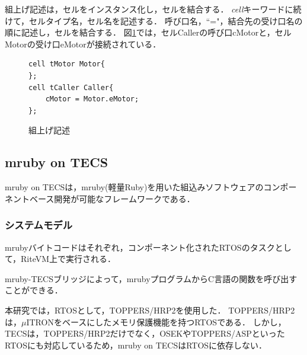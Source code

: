 \documentclass[submit,techrep]{ipsj}
\begin{document}
        組上げ記述は，セルをインスタンス化し，セルを結合する．
        {\it cell}キーワードに続けて，セルタイプ名，セル名を記述する．
        呼び口名，``="，結合先の受け口名の順に記述し，セルを結合する．
        図\ref{build}では，セルCallerの呼び口cMotorと，セルMotorの受け口eMotorが接続されている．
        
\begin{figure}[t]
\centering
\begin{lstlisting}
cell tMotor Motor{
};
cell tCaller Caller{
    cMotor = Motor.eMotor;
};
\end{lstlisting}
\caption{組上げ記述}
\vspace{-2mm}
\label{build}
\end{figure}

\vspace{-3mm} 
\subsection{mruby on TECS}
\label{sec:mruby on TECS}
mruby on TECSは，mruby(軽量Ruby)を用いた組込みソフトウェアのコンポーネントベース開発が可能なフレームワークである．

\subsubsection{システムモデル}
mrubyバイトコードはそれぞれ，コンポーネント化されたRTOSのタスクとして，RiteVM上で実行される．

mruby-TECSブリッジによって，mrubyプログラムからC言語の関数を呼び出すことができる．

本研究では，RTOSとして，TOPPERS/HRP2\cite{par:hr-tecs}を使用した．
TOPPERS/HRP2は，$\mu$ITRON\cite{par:microITRON}をベースにしたメモリ保護機能を持つRTOSである．
しかし，TECSは，TOPPERS/HRP2だけでなく，OSEK\cite{par:OSEK}やTOPPERS/ASP\cite{url:ASP}といったRTOSにも対応しているため，mruby on TECSはRTOSに依存しない．

\end{document}
